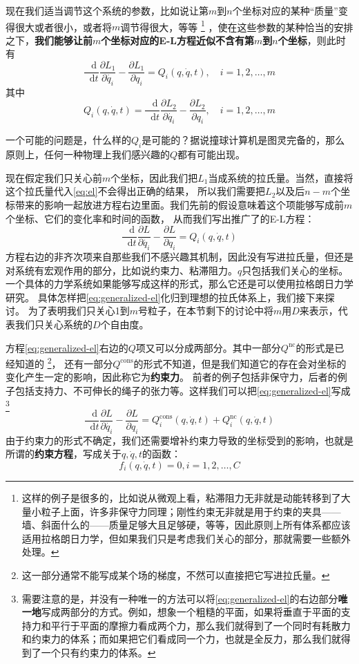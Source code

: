 \documentclass[UTF8, a4paper]{ctexart}
\newcommand*{\diff}{\mathop{}\!\mathrm{d}}
\begin{document}
现在我们适当调节这个系统的参数，比如说让第$m$到$n$个坐标对应的某种“质量”变得很大或者很小，或者将$m$调节得很大，等等%
\footnote{这样的例子是很多的，比如说从微观上看，粘滞阻力无非就是动能转移到了大量小粒子上面，许多非保守力同理；刚性约束无非就是用于约束的夹具——墙、斜面什么的——质量足够大且足够硬，等等，因此原则上所有体系都应该适用拉格朗日力学，但如果我们只是考虑我们关心的部分，那就需要一些额外处理。}%
，使在这些参数的某种恰当的安排之下，\textbf{我们能够让前$m$个坐标对应的E-L方程近似不含有第$m$到$n$个坐标}，则此时有
\[
    \frac{\diff}{\diff t} \frac{\partial L_1}{\partial \dot{q_i}} - \frac{\partial L_1}{\partial q_i} = Q_i(q, \dot{q}, t),
    \quad i = 1, 2, \ldots, m
\]
其中
\[
    Q_i(q, \dot{q}, t) = \frac{\diff}{\diff t} \frac{\partial L_2}{\partial \dot{q_i}} - \frac{\partial L_2}{\partial q_i},
    \quad i = 1, 2, \ldots, m
\]

一个可能的问题是，什么样的$Q_i$是可能的？据说撞球计算机是图灵完备的，那么原则上，任何一种物理上我们感兴趣的$Q$都有可能出现。

现在假定我们只关心前$m$个坐标，因此我们把$L_1$当成系统的拉氏量。当然，直接将这个拉氏量代入\eqref{eq:el}不会得出正确的结果，
所以我们需要把$L_2$以及后$n-m$个坐标带来的影响一起放进方程右边里面。我们先前的假设意味着这个项能够写成前$m$个坐标、它们的变化率和时间的函数，
从而我们写出推广了的E-L方程：
\begin{equation}
    \frac{\diff}{\diff t} \frac{\partial L}{\partial \dot{q_i}} - \frac{\partial L}{\partial q_i} = Q_i(q, \dot{q}, t)
    \label{eq:generalized-el}
\end{equation}
方程右边的非齐次项来自那些我们不感兴趣其机制，因此没有写进拉氏量，但还是对系统有宏观作用的部分，比如说约束力、粘滞阻力。$q$只包括我们关心的坐标。
一个具体的力学系统如果能够写成这样的形式，那么它还是可以使用拉格朗日力学研究。
具体怎样把\eqref{eq:generalized-el}化归到理想的拉氏体系上，我们接下来探讨。
为了表明我们只关心1到$m$号粒子，在本节剩下的讨论中将$m$用$D$来表示，代表我们只关心系统的$D$个自由度。

方程\eqref{eq:generalized-el}右边的$Q$项又可以分成两部分。其中一部分$Q^{\text{nc}}$的形式是已经知道的%
\footnote{这一部分通常不能写成某个场的梯度，不然可以直接把它写进拉氏量。}，
还有一部分$Q^\text{cons}$的形式不知道，但是我们知道它的存在会对坐标的变化产生一定的影响，因此称它为\textbf{约束力}。
前者的例子包括非保守力，后者的例子包括支持力、不可伸长的绳子的张力等。这样我们可以把\eqref{eq:generalized-el}写成%
\footnote{需要注意的是，并没有一种唯一的方法可以将\eqref{eq:generalized-el}的右边部分\textbf{唯一地}写成两部分的方式。例如，想象一个粗糙的平面，如果将垂直于平面的支持力和平行于平面的摩擦力看成两个力，那么我们就得到了一个同时有耗散力和约束力的体系；而如果把它们看成同一个力，也就是全反力，那么我们就得到了一个只有约束力的体系。}
\[
    \frac{\diff}{\diff t} \frac{\partial L}{\partial \dot{q_i}} - \frac{\partial L}{\partial q_i} = Q_i^{\text{cons}}(q, \dot{q}, t) + Q_i^{\text{nc}}(q, \dot{q}, t)
\]
由于约束力的形式不确定，我们还需要增补约束力导致的坐标受到的影响，也就是所谓的\textbf{约束方程}，写成关于$q, \dot{q}, t$的函数：
\[
    f_i(q, \dot{q}, t) = 0, i = 1, 2, \ldots, C
\]
\end{document}
